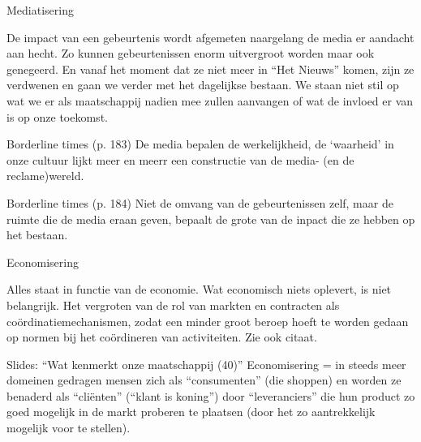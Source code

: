 \documentclass[main.tex]{subfiles}
\begin{document}
\begin{examenvraag}
    \begin{vraag}
        Mediatisering
    \end{vraag}

    \begin{antwoord}
        De impact van een gebeurtenis wordt afgemeten naargelang de media er aandacht aan hecht.‭ ‬Zo 
        kunnen gebeurtenissen enorm uitvergroot worden maar ook genegeerd.‭ ‬En vanaf het moment dat 
        ze niet meer in‭ “‬Het Nieuws‭”‬ komen,‭ ‬zijn ze verdwenen en gaan we verder met het dagelijkse 
        bestaan.‭ ‬We staan niet stil op wat we er als maatschappij nadien mee zullen aanvangen of 
        wat de invloed er van is op onze toekomst.
        \begin{citaat}{Borderline times (p. 183)}
            De media bepalen de werkelijkheid, de `waarheid' in onze cultuur lijkt meer en meerr een constructie van de media- (en de reclame)wereld.
        \end{citaat}
        \begin{citaat}{Borderline times (p. 184)}
            Niet de omvang van de gebeurtenissen zelf, maar de ruimte die de media eraan geven, bepaalt de grote van de inpact die ze hebben op het bestaan.
        \end{citaat}
    \end{antwoord}
\end{examenvraag}


\begin{examenvraag}
    \begin{vraag}
        Economisering
    \end{vraag}

    \begin{antwoord}
    	Alles staat in functie van de economie.‭
	‬Wat economisch niets oplevert,‭ ‬is niet belangrijk.
        Het vergroten van de rol van markten en contracten als co\"ordinatiemechanismen, zodat een 
        minder groot beroep hoeft te worden gedaan op normen bij het co\"ordineren van 
        activiteiten. Zie ook citaat.
        \begin{citaat}{Slides: ``Wat kenmerkt onze maatschappij (40)''}
            Economisering = in steeds meer domeinen gedragen mensen zich als “consumenten” (die shoppen) en worden ze benaderd als “cliënten” (“klant is koning”) door “leveranciers” die hun product zo goed mogelijk in de markt proberen te plaatsen (door het zo aantrekkelijk mogelijk voor te stellen).
        \end{citaat}
    \end{antwoord}
\end{examenvraag}
\end{document}

